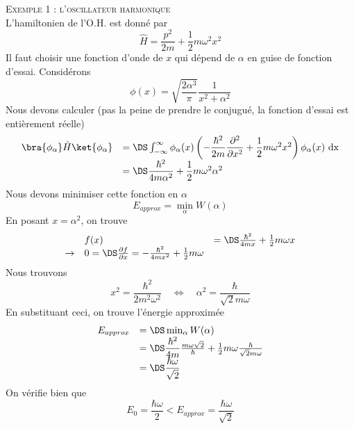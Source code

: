 		\textsc{Exemple 1 : l'oscillateur harmonique}\ \\
		L'hamiltonien de l'O.H. est donné par
		\begin{equation}
		\hat H = \frac{p^2}{2m}+\frac{1}{2}m\omega^2x^2
		\end{equation}
		Il faut choisir une fonction d'onde de $x$ qui dépend de $\alpha$ en guise de fonction 
		d'essai. Considérons 
		\begin{equation}
		\phi(x) = \sqrt{\dfrac{2\alpha^3}{\pi}}\dfrac{1}{x^2+\alpha^2}
		\end{equation}				
		Nous devons calculer (pas la peine de prendre le conjugué, la fonction d'essai est 
		entièrement réelle)
		\begin{equation}
		\begin{array}{ll}
		\bra{\phi_\alpha}\hat{H} \ket{\phi_\alpha} &=\DS \int_{-\infty}^\infty \phi_\alpha(x)\left(
		-\dfrac{\hbar^2}{2m}\dfrac{\partial^2}{\partial x^2} + \dfrac{1}{2}m\omega^2x^2\right)
		\phi_\alpha(x)\ \text{dx}\\
		&=\DS \dfrac{\hbar^2}{4m\alpha^2}+\dfrac{1}{2}m\omega^2\alpha^2
		\end{array}
		\end{equation}
		Nous devons minimiser cette fonction en $\alpha$
		\begin{equation}
		E_{approx} = \min_\alpha W(\alpha)
		\end{equation}
		En posant $x=\alpha^2$, on trouve
		\begin{equation}
		\begin{array}{lll}
		&f(x) &=\DS \frac{\hbar^2}{4mx}+\frac{1}{2}m\omega x\\
		\rightarrow& 0 =\DS \frac{\partial f}{\partial x} = -\frac{\hbar^2}{4m x^2}+\frac{1}{2}m\omega
		\end{array}
		\end{equation}
		Nous trouvons
		\begin{equation}
		x^2 = \dfrac{\hbar^2}{2m^2\omega^2} \quad\Leftrightarrow\quad \alpha^2 = \dfrac{\hbar}{\sqrt{2}m
		\omega}
		\end{equation}
		En substituant ceci, on trouve l'énergie approximée
		\begin{equation}
		\begin{array}{ll}
		E_{approx} &=\DS \min_\alpha W(\alpha)\\
		&=\DS \dfrac{\hbar^2}{4m}\frac{m\omega\sqrt{2}}{\hbar}+\frac{1}{2}m\omega\frac{\hbar}{\sqrt{2}m
		\omega}\\
		&=\DS\dfrac{\hbar\omega}{\sqrt{2}}	
		\end{array}
		\end{equation}
		On vérifie bien que 
		\begin{equation}
		E_0=\frac{\hbar\omega}{2} < E_{approx} = \frac{\hbar\omega}{\sqrt{2}}
		\end{equation}\ \\
		
